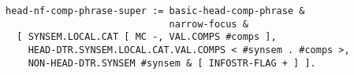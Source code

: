 \documentclass[a4paper]{article}
\begin{document}
{\small\begin{verbatim}
head-nf-comp-phrase-super := basic-head-comp-phrase & 
                             narrow-focus &
  [ SYNSEM.LOCAL.CAT [ MC -, VAL.COMPS #comps ],
    HEAD-DTR.SYNSEM.LOCAL.CAT.VAL.COMPS < #synsem . #comps >,
    NON-HEAD-DTR.SYNSEM #synsem & [ INFOSTR-FLAG + ] ].
\end{verbatim}}
\end{document}
